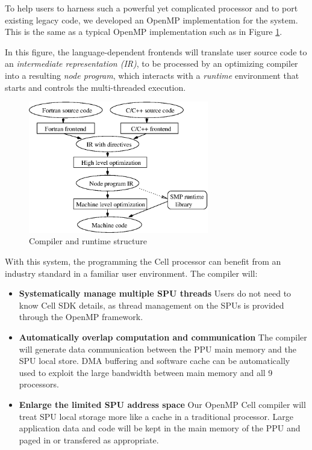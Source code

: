 To help users to harness such a powerful yet complicated processor and to port
existing legacy code, we developed an OpenMP\cite{Ope05} implementation for the
system. This is the same as a typical OpenMP implementation such as in Figure
\ref{fig:runtime}.

In this figure, the language-dependent frontends will translate user
source code to an \emph{intermediate representation (IR)}, to be
processed by an optimizing compiler into a resulting \emph{node
program}, which interacts with a \emph{runtime} environment that
starts and controls the multi-threaded execution.

\begin{figure}[!h]
  \begin{center}
    \includegraphics[angle=0, width=0.70\textwidth]{runtime.eps}
    \caption{\footnotesize Compiler and runtime structure}
    \label{fig:runtime}
  \end{center}
\end{figure}

With this system, the programming the Cell processor can benefit from
an industry standard in a familiar user environment. The compiler
will:

\begin{itemize} 

\item \textbf{Systematically manage multiple SPU threads} Users do not need to
  know Cell SDK details, as thread management on the SPUs is
  provided through the OpenMP framework.

\item \textbf{Automatically overlap computation and communication} The compiler
will generate data communication between the PPU main memory and the SPU
local store. DMA buffering and software cache can be automatically used to exploit
the large bandwidth between main memory and all 9 processors.

\item \textbf{Enlarge the limited SPU address space} Our OpenMP Cell
  compiler will treat SPU local storage more like a cache in a traditional
  processor. Large application data and code will be kept in the
  main memory of the PPU and paged in or transfered as appropriate.

\end{itemize}

